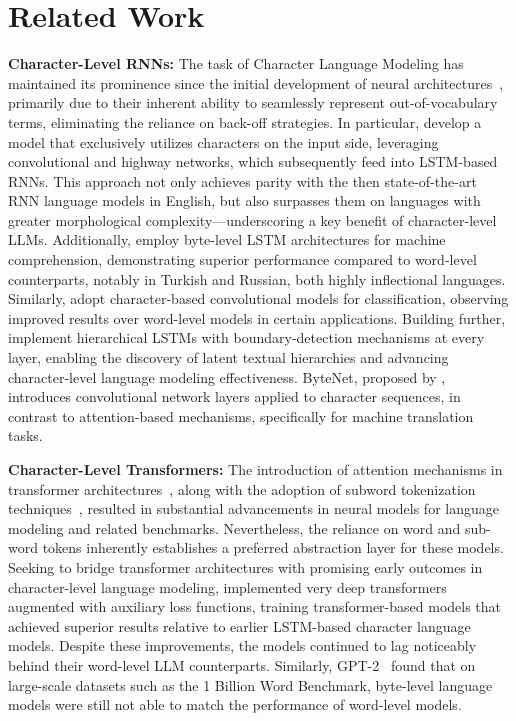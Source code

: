 \section{Related Work}
\label{section:related_work}

\textbf{Character-Level RNNs:} The task of Character Language Modeling has maintained its prominence since the initial development of neural architectures~\citep{sutskever2011generating,mikolov2012subword,graves2013generating}, primarily due to their inherent ability to seamlessly represent out-of-vocabulary terms, eliminating the reliance on back-off strategies. In particular, \cite{kim2016character} develop a model that exclusively utilizes characters on the input side, leveraging convolutional and highway networks, which subsequently feed into LSTM-based RNNs. This approach not only achieves parity with the then state-of-the-art RNN language models in English, but also surpasses them on languages with greater morphological complexity—underscoring a key benefit of character-level LLMs. Additionally, \cite{kenter2018byte} employ byte-level LSTM architectures for machine comprehension, demonstrating superior performance compared to word-level counterparts, notably in Turkish and Russian, both highly inflectional languages. Similarly, \cite{zhang2015character} adopt character-based convolutional models for classification, observing improved results over word-level models in certain applications. Building further, \citet{chung2019hierarchical} implement hierarchical LSTMs with boundary-detection mechanisms at every layer, enabling the discovery of latent textual hierarchies and advancing character-level language modeling effectiveness. ByteNet, proposed by \cite{kalchbrenner2016neural}, introduces convolutional network layers applied to character sequences, in contrast to attention-based mechanisms, specifically for machine translation tasks.

\textbf{Character-Level Transformers:} The introduction of attention mechanisms in transformer architectures~\citep{vaswani2017attention}, along with the adoption of subword tokenization techniques~\citep{sennrich-etal-2016-neural}, resulted in substantial advancements in neural models for language modeling and related benchmarks. Nevertheless, the reliance on word and sub-word tokens inherently establishes a preferred abstraction layer for these models. Seeking to bridge transformer architectures with promising early outcomes in character-level language modeling, \citet{al2019character} implemented very deep transformers augmented with auxiliary loss functions, training transformer-based models that achieved superior results relative to earlier LSTM-based character language models. Despite these improvements, the models continued to lag noticeably behind their word-level LLM counterparts. Similarly, GPT-2~\citep{radfordgpt2} found that on large-scale datasets such as the 1 Billion Word Benchmark, byte-level language models were still not able to match the performance of word-level models.

